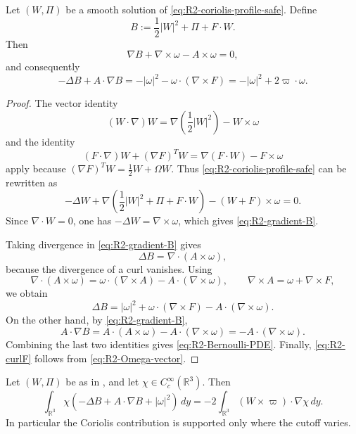 \begin{lemma}
\label{lem:R2-coriolis-bernoulli}
Let \((W,\Pi)\) be a smooth solution of
\eqref{eq:R2-coriolis-profile-safe}.  Define
\begin{equation}\label{eq:R2-Bernoulli-def}
   B:=\frac12|W|^2+\Pi+F\cdot W .
\end{equation}
Then
\begin{equation}\label{eq:R2-gradient-B}
   \nabla B+\nabla\times\omega-A\times\omega=0,
\end{equation}
and consequently
\begin{equation}\label{eq:R2-Bernoulli-PDE}
   -\Delta B+A\cdot\nabla B
   =
   -|\omega|^2-\omega\cdot(\nabla\times F)
   =
   -|\omega|^2+2\varpi\cdot\omega .
\end{equation}
\end{lemma}

\begin{proof}
The vector identity
\[
   (W\cdot\nabla)W=\nabla\left(\frac12|W|^2\right)-W\times\omega
\]
and the identity
\[
   (F\cdot\nabla)W+(\nabla F)^TW
   =\nabla(F\cdot W)-F\times\omega
\]
apply because
\((\nabla F)^TW=\frac12W+\Omega W\).  Thus
\eqref{eq:R2-coriolis-profile-safe} can be rewritten as
\[
   -\Delta W+
   \nabla\left(\frac12|W|^2+\Pi+F\cdot W\right)
   -(W+F)\times\omega=0 .
\]
Since \(\nabla\cdot W=0\), one has
\(-\Delta W=\nabla\times\omega\), which gives
\eqref{eq:R2-gradient-B}.

Taking divergence in \eqref{eq:R2-gradient-B} gives
\[
   \Delta B=\nabla\cdot(A\times\omega),
\]
because the divergence of a curl vanishes.  Using
\[
   \nabla\cdot(A\times\omega)
   =\omega\cdot(\nabla\times A)-A\cdot(\nabla\times\omega),
   \qquad
   \nabla\times A=\omega+\nabla\times F,
\]
we obtain
\[
   \Delta B
   =|\omega|^2+\omega\cdot(\nabla\times F)
      -A\cdot(\nabla\times\omega).
\]
On the other hand, by \eqref{eq:R2-gradient-B},
\[
   A\cdot\nabla B
   =A\cdot(A\times\omega)-A\cdot(\nabla\times\omega)
   =-A\cdot(\nabla\times\omega).
\]
Combining the last two identities gives \eqref{eq:R2-Bernoulli-PDE}.  Finally,
\eqref{eq:R2-curlF} follows from \eqref{eq:R2-Omega-vector}.
\end{proof}

\begin{lemma}
\label{lem:R2-coriolis-flux-localization}
Let \((W,\Pi)\) be as in , and let
\(\chi\in C_c^\infty(\mathbb R^3)\).  Then
\begin{equation}\label{eq:R2-local-coriolis-source}
   \int_{\mathbb R^3}\chi
   \left(
      -\Delta B+A\cdot\nabla B+|\omega|^2
   \right)\,dy
   =
   -2\int_{\mathbb R^3}(W\times\varpi)\cdot\nabla\chi\,dy .
\end{equation}
In particular the Coriolis contribution is supported only where the cutoff
varies.
\end{lemma}

